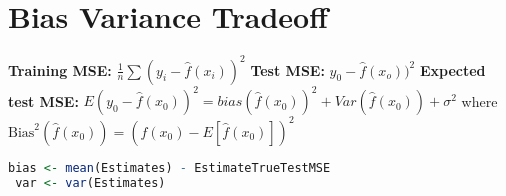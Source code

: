 \section{Bias Variance Tradeoff}
 \textbf{Training MSE:} $\frac{1}{n} \sum (y_i-\hat f(x_i))^2 $ \textbf{Test MSE:} $y_0 - \hat f(x_o))^2$ \textbf{Expected test MSE:} $E(y_0- \hat f(x_0))^2 = bias(\hat f(x_0))^2 + Var(\hat f(x_0)) + \sigma^2$ where $\text{Bias}^2(\hat f(x_0)) = (f(x_0)-E[\hat f(x_0)])^2$
 \begin{lstlisting}[language=R]
 bias <- mean(Estimates) - EstimateTrueTestMSE 
 var <- var(Estimates)
 \end{lstlisting}